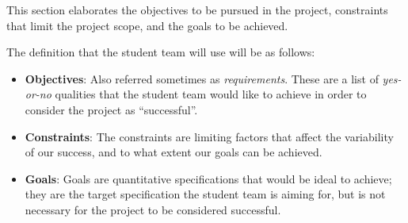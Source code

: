 This section elaborates the objectives to be pursued in the project, 
constraints that limit the project scope, 
and the goals to be achieved.

The definition that the student team will use will be as follows:

\begin{itemize}
    \item \textbf{Objectives}: Also referred sometimes as \textit{requirements}. 
    These are a list of \textit{yes-or-no} qualities that the student team 
    would like to achieve in order to consider the project as ``successful''.
    
    \item \textbf{Constraints}: The constraints are limiting factors that
    affect the variability of our success, and to what extent our goals
    can be achieved.

    \item \textbf{Goals}: Goals are quantitative specifications that would 
    be ideal to achieve; they are the target specification the student team
    is aiming for, but is not necessary for the project to be considered
    successful.

\end{itemize}